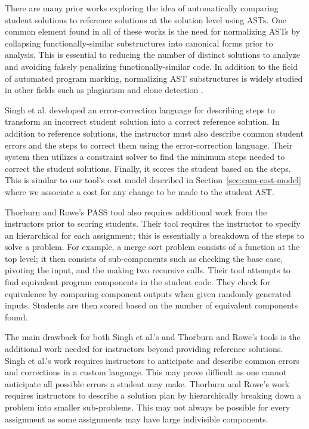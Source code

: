 There are many prior works exploring the idea of automatically comparing student solutions to reference solutions at the solution level using ASTs. One common element found in all of these works is the need for normalizing ASTs by collapsing functionally-similar substructures into canonical forms prior to analysis. This is essential to reducing the number of distinct solutions to analyze and avoiding falsely penalizing functionally-similar code. In addition to the field of automated program marking, normalizing AST substructures is widely studied in other fields such as plagiarism and clone detection \cite{baxter1998clone, feng2013code}.

Singh et al. \cite{singh2013automated} developed an error-correction language for describing steps to transform an incorrect student solution into a correct reference solution. In addition to reference solutions, the instructor must also describe common student errors and the steps to correct them using the error-correction language. Their system then utilizes a constraint solver to find the minimum steps needed to correct the student solutions. Finally, it scores the student based on the steps. This is similar to our tool's cost model described in Section~\ref{sec:cam-cost-model} where we associate a cost for any change to be made to the student AST.

Thorburn and Rowe's PASS tool \cite{thorburn1997pass} also requires additional work from the instructors prior to scoring students. Their tool requires the instructor to specify an hierarchical  for each assignment; this is essentially a breakdown of the steps to solve a problem. For example, a merge sort problem consists of a  function at the top level; it then consists of sub-components such as checking the base case, pivoting the input, and the making two recursive calls. Their tool attempts to find equivalent program components in the student code. They check for equivalence by comparing component outputs when given randomly generated inputs. Students are then scored based on the number of equivalent components found.

The main drawback for both Singh et al.'s and Thorburn and Rowe's tools is the additional work needed for instructors beyond providing reference solutions. Singh et al.'s work requires instructors to anticipate and describe common errors and corrections in a custom language. This may prove difficult as one cannot anticipate all possible errors a student may make. Thorburn and Rowe's work requires instructors to describe a solution plan by hierarchically breaking down a problem into smaller sub-problems. This may not always be possible for every assignment as some assignments may have large indivisible components.

